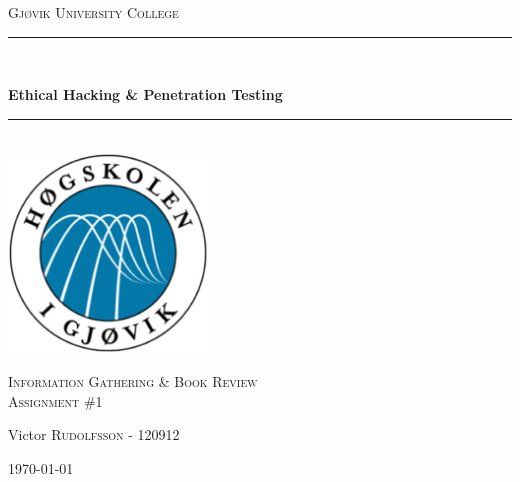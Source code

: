 \documentclass[12pt]{article} %
\begin{document}

\begin{titlepage}

\newcommand{\HRule}{\rule{\linewidth}{0.5mm}} %

\center %
\begin{myfont}
\textsc{{\large Gjøvik University College}}\\[0.5cm] %
\end{myfont}
\HRule \\[0.4cm]

\begin{myfont}
{ \huge \bfseries Ethical Hacking \& Penetration Testing}\\[0cm] %
\end{myfont}

\HRule \\[0.4cm]
\includegraphics[width=200px, height=200px]{logo}\\[0.8cm] %
\begin{myfont}
\textsc{\Large Information Gathering \& Book Review}\\[0.5cm] %
\textsc{\large Assignment \#1}\\[0.5cm] %
\end{myfont}


\begin{minipage}{0.44\textwidth}
\begin{flushleft} \large
\begin{myfont}
Victor \textsc{Rudolfsson} - 120912\\ %
\end{myfont}
\end{flushleft}
\end{minipage}



\vfill %
{\large \today}\\[3cm] %

\end{titlepage}
\end{document}
